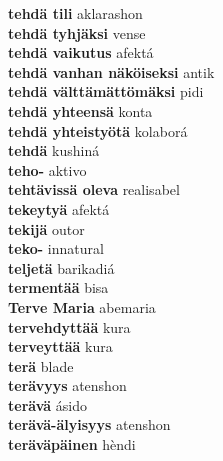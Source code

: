 \textbf{ tehdä tili  } aklarashon \\
\textbf{ tehdä tyhjäksi  } vense \\
\textbf{ tehdä vaikutus  } afektá \\
\textbf{ tehdä vanhan näköiseksi  } antik \\
\textbf{ tehdä välttämättömäksi  } pidi \\
\textbf{ tehdä yhteensä  } konta \\
\textbf{ tehdä yhteistyötä  } kolaborá \\
\textbf{ tehdä  } kushiná \\
\textbf{ teho-  } aktivo \\
\textbf{ tehtävissä oleva  } realisabel \\
\textbf{ tekeytyä  } afektá \\
\textbf{ tekijä  } outor \\
\textbf{ teko-  } innatural \\
\textbf{ teljetä  } barikadiá \\
\textbf{ termentää  } bisa \\
\textbf{ Terve Maria  } abemaria \\
\textbf{ tervehdyttää  } kura \\
\textbf{ terveyttää  } kura \\
\textbf{ terä  } blade \\
\textbf{ terävyys  } atenshon \\
\textbf{ terävä  } ásido \\
\textbf{ terävä-älyisyys  } atenshon \\
\textbf{ teräväpäinen  } hèndi \\

